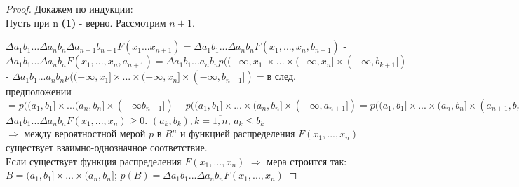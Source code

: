 \begin{proof}
  Докажем по индукции:\\
  Пусть при n \textbf{(1)} - верно. Рассмотрим $n+1$.\par
  $\Delta a_{1}b_{1}...\Delta a_{n}b_{n}\Delta a_{n+1}b_{n+1} F(x_{1}...x_{n+1}) = \Delta a_{1}b_{1}...\Delta a_{n}b_{n} F(x_{1},...,x_{n},b_{n+1})$ - \\$\Delta a_{1}b_{1}... \Delta a_{n}b_{n} F(x_{1},...,x_{n},a_{n+1}) = \Delta a_{1}b_{1}...a_{n}b_{n} p((-\infty, x_{1}]\times ... \times (-\infty, x_{n}]\times (-\infty, b_{k+1}])$ - $ \Delta a_{1}b_{1}... a_{n}b_{n} p((-\infty, x_{1}]\times ... \times (-\infty, x_{n}]\times (-\infty, b_{n+1}]) = $в след. предположении $= p((a_{1}, b_{1}]\times ... (a_{n}, b_{n}]\times (-\infty b_{n+1}]) - p((a_{1}, b_{1}]\times ... \times (a_{n}, b_{n}] \times (-\infty , a_{n+1}]) = p((a_{1}, b_{1}]\times ... \times (a_{n}, b_{n}] \times (a_{n+1} , b_{n+1}])$\\
  $\Delta a_{1}b_{1}...\Delta a_{n}b_{n} F(x_{1},...,x_{n}) \geq 0$. $(a_{k}, b_{k}), k=\overline{1,n}$, $a_{k} \leq b_{k}$\\
  $\Rightarrow$ между вероятностной мерой $p$ в $R^{n}$ и функцией распределения $F(x_{1},...,x_{n})$ существует взаимно-однозначное соответствие.\\
  Если существует функция распределения $F(x_{1},...,x_{n})$ $\Rightarrow$  мера строится так:\\
  $B=(a_{1},b_{1}]\times ... \times (a_{n}, b_{n}]$; $p(B) = \Delta a_{1}b_{1}...\Delta a_{n}b_{n} F(x_{1}, ..., x_{n})$
\end{proof}
